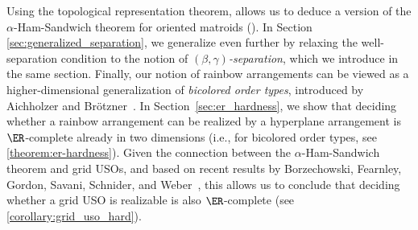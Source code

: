 %
Using the topological representation theorem,  allows us to deduce a version of the $\alpha$-Ham-Sandwich theorem for oriented matroids ().
%
In Section \ref{sec:generalized_separation}, we generalize  even further by relaxing the well-separation condition to the notion of \emph{$(\beta,\gamma)$-separation}, which we introduce in the same section.
%
Finally, our notion of rainbow arrangements can be viewed as a higher-dimensional generalization of \emph{bicolored order types}, introduced by Aichholzer and Br\"{o}tzner~\cite{aichholzerBicoloredOrderTypes2024}. In Section~\ref{sec:er_hardness}, we show that deciding whether a rainbow arrangement can be realized by a hyperplane arrangement is $\ER$-complete already in two dimensions (i.e., for bicolored order types, see \cref{theorem:er-hardness}). Given the connection between the $\alpha$-Ham-Sandwich theorem and grid USOs, and based on recent results by Borzechowski, Fearnley, Gordon, Savani, Schnider, and Weber~\cite{borzechowskiTwoChoicesAre2024}, this allows us to conclude that deciding whether a grid USO is realizable is also $\ER$-complete (see \cref{corollary:grid_uso_hard}).
%
%
